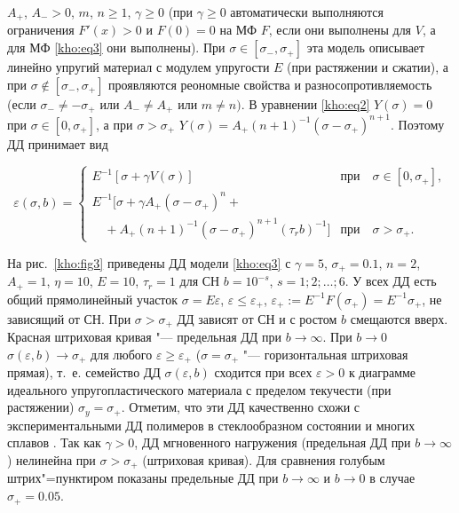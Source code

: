 $A_{+}$, $A_{-}>0$, $m$, $n\ge1$, $\gamma\ge0$ (при $\gamma\ge0$ автоматически выполняются ограничения $F'(x)>0$ и $F(0)=0$ на МФ $F$, если они выполнены для $V$, а для МФ \eqref{kho:eq3} они выполнены). При $\sigma\in[\sigma_{-},\sigma_{+}]$ эта модель описывает линейно упругий материал с модулем упругости $E$ (при растяжении и сжатии), а при $\sigma\notin[\sigma_{-},\sigma_{+}]$ проявляются реономные свойства и разносопротивляемость (если $\sigma_{-}\ne-\sigma_{+}$ или $A_{-}\ne A_{+}$ или $m\ne n)$. В уравнении \eqref{kho:eq2} $Y(\sigma)=0$ при $\sigma\in[0,\sigma_{+}]$, а при $\sigma>\sigma_{+}$ $Y(\sigma)=A_{+}(n+1)^{-1}(\sigma-\sigma_{+})^{n+1}$. Поэтому ДД принимает вид

$$

\varepsilon(\sigma,b)=

\begin{cases}

E^{-1}[\sigma+\gamma V(\sigma)] &\text{при~~ } \sigma\in[0,\sigma_{+}],

\\

E^{-1}[\sigma+\gamma A_{+}(\sigma-\sigma_{+})^n+ \\ \quad  + A_{+}(n+1)^{-1}(\sigma-\sigma_{+})^{n+1}(\tau_r b)^{-1}] &\text{при~~ } \sigma>\sigma_{+}.

\end{cases}

$$



На рис.~\ref{kho:fig3} приведены ДД модели \eqref{kho:eq3} с $\gamma=5$, $\sigma_{+}=0.1$, $n=2$, $A_{+}=1$, $\eta=10$, $E=10$, $\tau_r=1$ для СН $b=10^{-s}$, $s=1; 2; \dots;6$. У всех ДД есть общий прямолинейный участок $\sigma=E\varepsilon$, $\varepsilon\le\varepsilon_{+}$, $\varepsilon_{+}:=E^{-1}F(\sigma_{+})=E^{-1}\sigma_{+}$, не зависящий от СН. При $\sigma>\sigma_{+}$ ДД зависят от СН и с ростом $b$ смещаются вверх. Красная штриховая кривая "--- предельная ДД при $b\to\infty$. При $b\to0$ $\sigma(\varepsilon,b)\to\sigma_{+}$ для любого $\varepsilon\ge\varepsilon_{+}$ ($\sigma=\sigma_{+}$ "--- горизонтальная штриховая прямая), т.~е. семейство ДД $\sigma(\varepsilon,b)$ сходится при всех $\varepsilon>0$ к диаграмме идеального упругопластического материала с пределом текучести (при растяжении) $\sigma_y=\sigma_{+}$. Отметим, что эти ДД качественно схожи с экспериментальными ДД полимеров в стеклообразном состоянии и многих сплавов \cite{kho:bib9,kho:bib21,kho:bib22,kho:bib23,kho:bib24,kho:bib25}. Так как $\gamma>0$, ДД мгновенного нагружения (предельная ДД при $b\to\infty$) нелинейна при $\sigma>\sigma_{+}$ (штриховая кривая). Для сравнения голубым штрих"=пунктиром показаны предельные ДД при $b\to\infty$ и $b\to0$ в случае $\sigma_{+}=0.05$.



